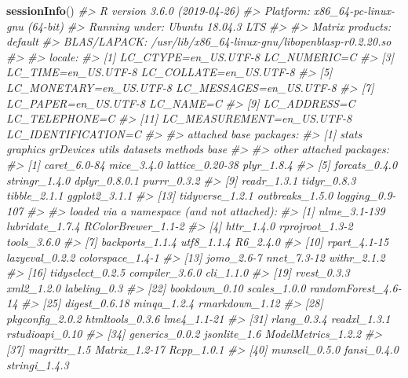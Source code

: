 \documentclass[]{book}
\newenvironment{Shaded}{\begin{snugshade}}{\end{snugshade}}
\newcommand{\CommentTok}[1]{\textcolor[rgb]{0.56,0.35,0.01}{\textit{#1}}}
\newcommand{\KeywordTok}[1]{\textcolor[rgb]{0.13,0.29,0.53}{\textbf{#1}}}
\newcommand{\NormalTok}[1]{#1}
\begin{document}
\begin{Shaded}
\begin{Highlighting}[]
\KeywordTok{sessionInfo}\NormalTok{()}
\CommentTok{#> R version 3.6.0 (2019-04-26)}
\CommentTok{#> Platform: x86_64-pc-linux-gnu (64-bit)}
\CommentTok{#> Running under: Ubuntu 18.04.3 LTS}
\CommentTok{#> }
\CommentTok{#> Matrix products: default}
\CommentTok{#> BLAS/LAPACK: /usr/lib/x86_64-linux-gnu/libopenblasp-r0.2.20.so}
\CommentTok{#> }
\CommentTok{#> locale:}
\CommentTok{#>  [1] LC_CTYPE=en_US.UTF-8       LC_NUMERIC=C              }
\CommentTok{#>  [3] LC_TIME=en_US.UTF-8        LC_COLLATE=en_US.UTF-8    }
\CommentTok{#>  [5] LC_MONETARY=en_US.UTF-8    LC_MESSAGES=en_US.UTF-8   }
\CommentTok{#>  [7] LC_PAPER=en_US.UTF-8       LC_NAME=C                 }
\CommentTok{#>  [9] LC_ADDRESS=C               LC_TELEPHONE=C            }
\CommentTok{#> [11] LC_MEASUREMENT=en_US.UTF-8 LC_IDENTIFICATION=C       }
\CommentTok{#> }
\CommentTok{#> attached base packages:}
\CommentTok{#> [1] stats     graphics  grDevices utils     datasets  methods   base     }
\CommentTok{#> }
\CommentTok{#> other attached packages:}
\CommentTok{#>  [1] caret_6.0-84    mice_3.4.0      lattice_0.20-38 plyr_1.8.4     }
\CommentTok{#>  [5] forcats_0.4.0   stringr_1.4.0   dplyr_0.8.0.1   purrr_0.3.2    }
\CommentTok{#>  [9] readr_1.3.1     tidyr_0.8.3     tibble_2.1.1    ggplot2_3.1.1  }
\CommentTok{#> [13] tidyverse_1.2.1 outbreaks_1.5.0 logging_0.9-107}
\CommentTok{#> }
\CommentTok{#> loaded via a namespace (and not attached):}
\CommentTok{#>  [1] nlme_3.1-139        lubridate_1.7.4     RColorBrewer_1.1-2 }
\CommentTok{#>  [4] httr_1.4.0          rprojroot_1.3-2     tools_3.6.0        }
\CommentTok{#>  [7] backports_1.1.4     utf8_1.1.4          R6_2.4.0           }
\CommentTok{#> [10] rpart_4.1-15        lazyeval_0.2.2      colorspace_1.4-1   }
\CommentTok{#> [13] jomo_2.6-7          nnet_7.3-12         withr_2.1.2        }
\CommentTok{#> [16] tidyselect_0.2.5    compiler_3.6.0      cli_1.1.0          }
\CommentTok{#> [19] rvest_0.3.3         xml2_1.2.0          labeling_0.3       }
\CommentTok{#> [22] bookdown_0.10       scales_1.0.0        randomForest_4.6-14}
\CommentTok{#> [25] digest_0.6.18       minqa_1.2.4         rmarkdown_1.12     }
\CommentTok{#> [28] pkgconfig_2.0.2     htmltools_0.3.6     lme4_1.1-21        }
\CommentTok{#> [31] rlang_0.3.4         readxl_1.3.1        rstudioapi_0.10    }
\CommentTok{#> [34] generics_0.0.2      jsonlite_1.6        ModelMetrics_1.2.2 }
\CommentTok{#> [37] magrittr_1.5        Matrix_1.2-17       Rcpp_1.0.1         }
\CommentTok{#> [40] munsell_0.5.0       fansi_0.4.0         stringi_1.4.3      }

\end{Highlighting}
\end{Shaded}
\end{document}
